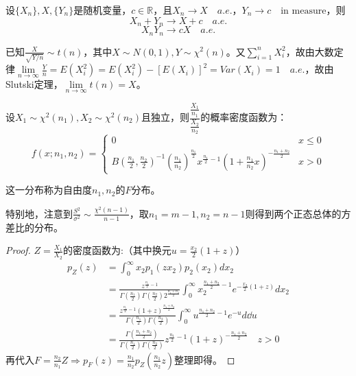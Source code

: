 \documentclass[UTF-8]{ctexbeamer}
\begin{document}
\begin{frame}
  \begin{Lemma}[Slutski]
    设$\{X_{n}\},X,\{Y_{n}\}$是随机变量，$c\in\mathbb{R}$，且$X_{n}\to X\quad a.e.$，$Y_{n}\to c\quad \text{in measure}$，则\[X_{n}+Y_{n}\to X+c\quad a.e.\]\[X_{n}Y_{n}\to cX\quad a.e.\]
  \end{Lemma}
  
  已知$\frac{X}{\sqrt{Y/n}}\sim t(n)$，其中$X\sim N(0,1),Y\sim \chi^{2}(n)$。又$\sum_{i=1}^{n}X_{i}^{2}$，故由大数定律$\lim\limits_{n\to\infty}\frac{Y}{n}=E(X_{i}^{2})=E(X_{i}^{2})-[E(X_{i})]^{2}=Var(X_{i})=1\quad a.e.$，故由Slutski定理，$\lim\limits_{n\to\infty}t(n)=X$。
\end{frame}

\begin{frame}
  \begin{Thm}
  设$X_{1}\sim \chi^{2}(n_{1}),X_{2}\sim\chi^{2}(n_{2})$且独立，则$\dfrac{\frac{X_{1}}{n_{1}}}{\frac{X_{2}}{n_{2}}}$的概率密度函数为：
\begin{equation*}
  f(x;n_{1},n_{2})=
    \begin{cases}
      0&x\leq 0\\
      B(\frac{n_{1}}{2},\frac{n_{2}}{2})^{-1}
        (\frac{n_{1}}{n_{2}})^{\frac{n_{1}}{2}}x^{\frac{n_{1}}{2}-1}(1+\frac{n_{1}}{n_{2}}x)^{-\frac{n_{1}+n_{2}}{2}}& x>0
    \end{cases}
  \end{equation*}
\end{Thm}
这一分布称为自由度$n_{1},n_{2}$的$F$分布。

特别地，注意到$\frac{S^{2}}{\sigma^{2}}\sim\frac{\chi^{2}(n-1)}{n-1}$，取$n_{1}=m-1,n_{2}=n-1$则得到两个正态总体的方差比的分布。
\end{frame}

\begin{frame}
  \begin{proof}
    $Z=\frac{X_{1}}{X_{2}}$的密度函数为:（其中换元$u=\frac{x_{2}}{2}(1+z)$）
$$
\begin{aligned}
p_{Z}(z) &=\int_{0}^{\infty} x_{2} p_{1}\left(z x_{2}\right) p_{2}\left(x_{2}\right) d x_{2} \\
&=\frac{z^{\frac{n_{1}}{2}-1}}{\Gamma\left(\frac{n_{1}}{2}\right) \Gamma\left(\frac{n_{2}}{2}\right) 2^{\frac{n_{1}+n_{2}}{2}}} \int_{0}^{\infty} x_{2}^{\frac{n_{1}+n_{2}}{2}-1} e^{-\frac{x_{2}}{2}(1+z)} d x_{2}\\
&=\frac{z^{\frac{n_{1}}{2}-1}(1+z)^{\frac{n_{1}+n_{2}}{2}}}{\Gamma\left(\frac{n_{1}}{2}\right) \Gamma\left(\frac{n_{2}}{2}\right)} \int_{0}^{\infty} u^{\frac{n_{1}+n_{2}}{2}-1} e^{-u} d \dd u\\
&=\frac{\Gamma\left(\frac{n_{1}+n_{2}}{2}\right)}{\Gamma\left(\frac{n_{1}}{2}\right) \Gamma\left(\frac{n_{2}}{2}\right)} z^{\frac{n_{1}}{2}-1}(1+z)^{-\frac{n_{1}+n_{2}}{2}} \quad z>0
\end{aligned}
$$
再代入$F=\frac{n_{2}}{n_{1}}Z\Rightarrow p_{F}(z)=\frac{n_{1}}{n_{2}}p_{Z}(\frac{n_{1}}{n_{2}}z)$整理即得。
\end{proof}
\end{frame}
\end{document}
